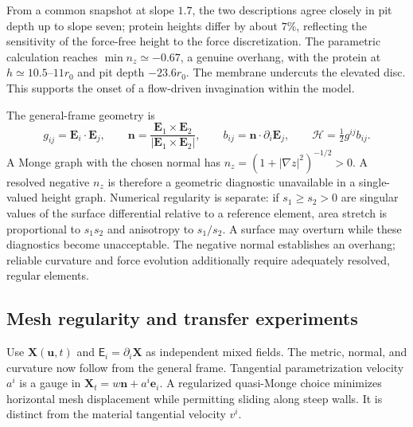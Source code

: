 From a common snapshot at slope $1.7$, the two descriptions agree closely in pit depth up to slope seven; protein heights differ by about $7\%$, reflecting the sensitivity of the force-free height to the force discretization. The parametric calculation reaches $\min n_z\simeq-0.67$, a genuine overhang, with the protein at $h\simeq10.5$--$11r_0$ and pit depth $-23.6r_0$. The membrane undercuts the elevated disc. This supports the onset of a flow-driven invagination within the model.




The general-frame geometry is
\begin{equation}
g_{ij}=\bm E_i\cdot\bm E_j,\qquad
\bm n=\frac{\bm E_1\times\bm E_2}{|\bm E_1\times\bm E_2|},\qquad
b_{ij}=\bm n\cdot\partial_i\bm E_j,
\qquad \mathcal H=\tfrac12g^{ij}b_{ij}.
\label{eq:parametric-geometry}
\end{equation}
A Monge graph with the chosen normal has $n_z=(1+|\nabla z|^2)^{-1/2}>0$. A resolved negative $n_z$ is therefore a geometric diagnostic unavailable in a single-valued height graph. Numerical regularity is separate: if $s_1\ge s_2>0$ are singular values of the surface differential relative to a reference element, area stretch is proportional to $s_1s_2$ and anisotropy to $s_1/s_2$. A surface may overturn while these diagnostics become unacceptable. The negative normal establishes an overhang; reliable curvature and force evolution additionally require adequately resolved, regular elements.

\subsection{Mesh regularity and transfer experiments}


Use $\bm X(\bm u,t)$ and $\mathsf E_i=\partial_i\bm X$ as independent mixed fields. The metric, normal, and curvature now follow from the general frame. Tangential parametrization velocity $a^i$ is a gauge in $\bm X_t=w\bm n+a^i\bm e_i$. A regularized quasi-Monge choice minimizes horizontal mesh displacement while permitting sliding along steep walls. It is distinct from the material tangential velocity $v^i$.

